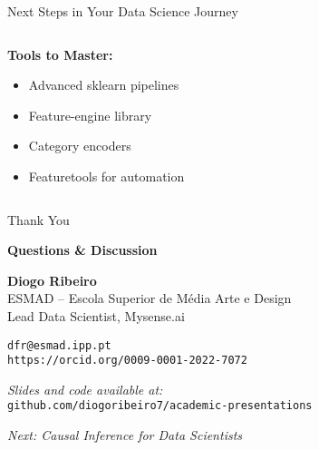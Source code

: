 \documentclass[aspectratio=169,11pt]{beamer}
\begin{document}
\begin{frame}{Next Steps in Your Data Science Journey}
\begin{columns}
\begin{column}{0.5\textwidth}
\vspace{0.3cm}
\textbf{Tools to Master:}
\begin{itemize}
\item Advanced sklearn pipelines
\item Feature-engine library
\item Category encoders
\item Featuretools for automation
\end{itemize}
\end{column}
\end{columns}
\end{frame}

\begin{frame}
\begin{center}
{\Huge Thank You}

\vspace{0.8cm}

\textbf{Questions \& Discussion}

\vspace{1cm}

\textbf{Diogo Ribeiro}\\
ESMAD -- Escola Superior de Média Arte e Design\\
Lead Data Scientist, Mysense.ai\\

\vspace{0.5cm}

\texttt{dfr@esmad.ipp.pt}\\
\texttt{https://orcid.org/0009-0001-2022-7072}

\vspace{0.8cm}

\textit{Slides and code available at:}\\
\texttt{github.com/diogoribeiro7/academic-presentations}

\vspace{0.5cm}

\textit{Next: Causal Inference for Data Scientists}
\end{center}
\end{frame}
\end{document}
